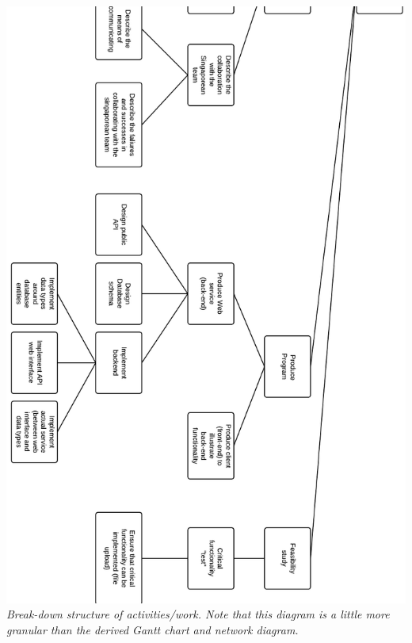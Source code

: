 \includegraphics[scale=0.46]{./Appendices/workbreakdown-p2.png}
\emph{Break-down structure of activities/work. Note that this diagram is a
little more granular than the derived Gantt chart and network diagram.}
